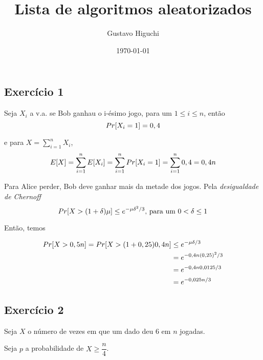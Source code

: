 \documentclass{article}
\title{Lista de algoritmos aleatorizados}
\author{Gustavo Higuchi}
\date{\today}
\begin{document}
\maketitle

\tableofcontents
\newpage


\chapter{}
\section{Exercício 1}
Seja $X_i$ a v.a. se Bob ganhau o i-ésimo jogo, para um $1\leq i \leq n$, então\\

\begin{equation}
	\notag
	Pr[X_i = 1] = 0,4
\end{equation}

e para $X = \sum\limits_{i=1}^n X_i$,
\begin{equation}
	\notag
	E[X] = \sum\limits_{i=1}^n E[X_i] = \sum\limits_{i=1}^n Pr[X_i = 1] = \sum\limits_{i=1}^n 0,4 = 0,4n
\end{equation}

Para Alice perder, Bob deve ganhar mais da metade dos jogos. Pela \emph{desigualdade de Chernoff}
\begin{equation}
	\notag
	Pr[X > (1 + \delta)\mu] \leq e^{-\mu \delta^2 / 3}\text{, para um }0 < \delta \leq 1
\end{equation}

Então, temos

\begin{equation}
	\notag
	\begin{split}
		Pr[X > 0,5n] = Pr[X > (1 + 0,25)0,4n] &\leq e^{-\mu \delta / 3}\\
		&= e^{-0,4n (0,25)^2 / 3} \\
		&= e^{-0,4n 0,0125 / 3}\\
		&= e^{-0,025n / 3}
	\end{split}
\end{equation}

\section{Exercício 2}
Seja $X$ o número de vezes em que um dado deu 6 em $n$ jogadas.

Seja $p$ a probabilidade de $X \geq \dfrac{n}{4}$.
\end{document}
